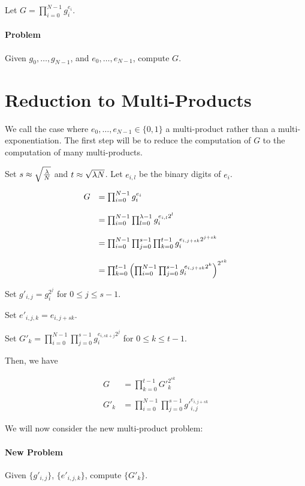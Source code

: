 Let $G = \prod_{i=0}^{N-1} g_i^{e_i}$.

\paragraph{Problem}

Given $g_0,\ldots,g_{N-1}$, and $e_0,\ldots,e_{N-1}$, compute $G$.

\section{Reduction to Multi-Products}

We call the case where $e_0,\ldots,e_{N-1} \in \{0,1\}$ a multi-product rather than a multi-exponentiation. The first step will be to reduce the computation of $G$ to the computation of many multi-products.

Set $s \approx \sqrt{\frac{\lambda}{N}}$ and $t \approx \sqrt{\lambda N}$. Let $e_{i,l}$ be the binary digits of $e_i$.

$$\begin{array}{ll}
G &= \prod_{i=0}^{N-1} g_i^{e_i} \\ \\
& = \prod_{i=0}^{N-1} \prod_{l=0}^{\lambda-1} g_i^{e_{i,l}2^l} \\ \\
& = \prod_{i=0}^{N-1} \prod_{j=0}^{s-1} \prod_{k=0}^{t-1} g_i^{e_{i,j+sk} 2^{j+sk}} \\ \\
& = \prod_{k=0}^{t-1} \left( \prod_{i=0}^{N-1} \prod_{j=0}^{s-1} g_i^{e_{i,j+sk} 2^k} \right)^{2^{sk}}
\end{array}$$

Set $g'_{i,j} = g_i^{2^j}$ for $0 \leq j \leq s-1$.

Set $e'_{i,j,k} = e_{i,j+sk}$.

Set $G'_{k} = \prod_{i=0}^{N-1} \prod_{j=0}^{s-1} g_i^{e_{i,sk+j} 2^j}$ for $0 \leq k \leq t-1$.

Then, we have

$$\begin{array}{ll}
G &= \prod_{k=0}^{t-1} {G'}_{k}^{2^{sk}} \\ \\
G'_{k} &= \prod_{i=0}^{N-1} \prod_{j=0}^{s-1} {g'}_{i,j}^{e_{i,j+sk}}
\end{array}$$

We will now consider the new multi-product problem:

\paragraph{New Problem} Given $\{g'_{i,j}\}$, $\{ e'_{i,j,k} \}$, compute $\{ G'_k \}$.


